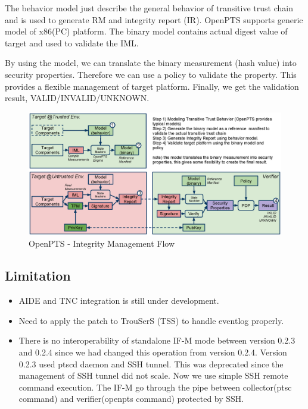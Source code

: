 \documentclass[10pt,a4paper]{article}
\begin{document}
The behavior model just describe the general behavior of transitive trust chain and is used to generate RM and integrity report (IR).
OpenPTS supports generic model of x86(PC) platform.
The binary model contains actual digest value of target and used to validate the IML.

By using the model, we can translate the binary measurement (hash value) into security properties.
Therefore we can use a policy to validate the property.
This provides a flexible management of target platform.
Finally, we get the validation result, VALID/INVALID/UNKNOWN.


\begin{figure}[hb!p]
  \begin{center}
    \includegraphics[width=15cm]{OpenPTS-fig-dataflow.eps}
  \end{center}
  \caption{OpenPTS - Integrity Management Flow}
  \label{fig:openpts-dataflow}
\end{figure}

\subsection{Limitation}

\begin{itemize}
\item AIDE and TNC integration is still under development.
\item Need to apply the patch to TrouSerS (TSS) to handle eventlog properly.
\item 
There is no interoperability of standalone IF-M mode between version 0.2.3 and 0.2.4
since we had changed this operation from version 0.2.4.
Version 0.2.3 used ptscd daemon and SSH tunnel.
This was deprecated since the management of SSH tunnel did not scale.
Now we use simple SSH remote command execution.
The IF-M go through the pipe between collector(ptsc command) and verifier(openpts command) protected by SSH.
\end{itemize} 
\end{document}
